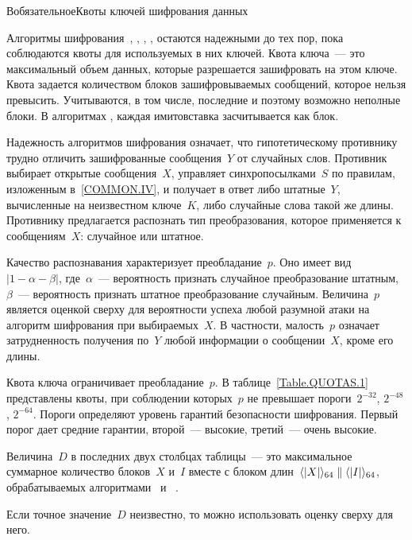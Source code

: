 \begin{appendix}{В}{обязательное}{Квоты ключей шифрования данных}\label{QUOTAS}

\mbox{}

Алгоритмы шифрования~, , 
, ,  остаются 
надежными до тех пор, пока соблюдаются квоты для используемых в них ключей.
%
Квота ключа~--- это максимальный объем данных, которые разрешается
зашифровать на этом ключе. Квота задается количеством блоков 
зашифровываемых сообщений, которое нельзя превысить. 
Учитываются, в том числе, последние и поэтому возможно неполные блоки. 
%
В алгоритмах ,  каждая имитовставка 
засчитывается как блок.

Надежность алгоритмов шифрования означает, что гипотетическому 
противнику трудно отличить зашифрованные сообщения~$Y$ от случайных слов. 
Противник выбирает открытые сообщения~$X$, управляет синхропосылками~$S$ 
по правилам, изложенным в~\ref{COMMON.IV}, и получает в ответ 
либо штатные~$Y$, вычисленные на неизвестном ключе~$K$, либо случайные слова 
такой же длины. Противнику предлагается распознать тип преобразования,
которое применяется к сообщениям~$X$: случайное или штатное. 

Качество распознавания характеризует преобладание~$p$.
Оно имеет вид~$|1-\alpha-\beta|$, 
где~$\alpha$~--- вероятность признать случайное преобразование штатным,
$\beta$~--- вероятность признать штатное преобразование случайным.
%
Величина~$p$ является оценкой сверху для вероятности успеха любой разумной атаки
на алгоритм шифрования при выбираемых~$X$. В частности, малость~$p$
означает затрудненность получения по~$Y$ любой информации о сообщении~$X$,
кроме его длины.

Квота ключа ограничивает преобладание~$p$.
%
В таблице~\ref{Table.QUOTAS.1} представлены квоты, 
при соблюдении которых~$p$ не превышает пороги~$2^{-32}$, $2^{-48}$, 
$2^{-64}$. Пороги определяют уровень гарантий безопасности шифрования.
Первый порог дает средние гарантии, 
второй~--- высокие, третий~--- очень высокие.

Величина~$D$ в последних двух столбцах таблицы~--- это максимальное 
суммарное количество блоков~$X$ и~$I$ вместе с блоком 
длин~$\langle|X|\rangle_{64}\parallel\langle|I|\rangle_{64}$, 
обрабатываемых алгоритмами~ и ~. 


Если точное значение~$D$ неизвестно, то можно использовать оценку 
сверху для него.


\end{appendix}
